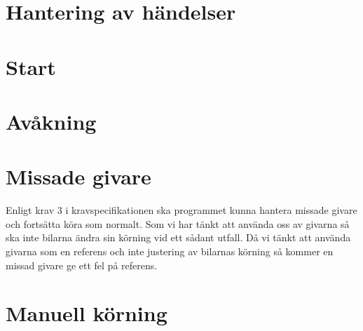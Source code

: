 \section{Hantering av händelser}


\section{Start}

\section{Avåkning}


\section{Missade givare}

Enligt krav 3 i kravspecifikationen ska programmet kunna hantera missade givare och fortsätta köra som normalt. Som vi har tänkt att använda oss av givarna så ska inte bilarna ändra sin körning vid ett sådant utfall. Då vi tänkt att använda givarna som en referens och inte justering av bilarnas körning så kommer en missad givare ge ett fel på referens.


\section{Manuell körning}

